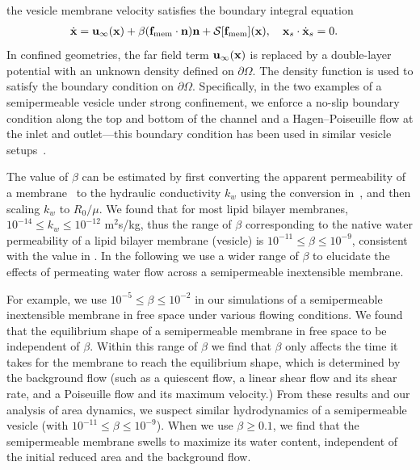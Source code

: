 \documentclass[prb,preprint,showpacs,preprintnumbers,amsmath,amssymb,longbibliography]{revtex4-1}
\begin{document}
%
the vesicle membrane velocity satisfies the boundary integral equation
\begin{align}
  \label{eqn:vesVelocity}
  \dot{\mathbf{x}} &= \mathbf{u}_\infty(\mathbf{x}) + \beta (\mathbf{f}_\mathrm{mem}\cdot\mathbf{n})\mathbf{n}
  + \mathcal{S} [\mathbf{f}_\mathrm{mem}](\mathbf{x}),  \quad
  \mathbf{x}_s \cdot \dot{\mathbf{x}}_s = 0.
\end{align}
In confined geometries, the far field term $\mathbf{u}_\infty(\mathbf{x})$ is replaced
by a double-layer potential with an unknown density defined on
$\partial\Omega$. The density function is used to satisfy the boundary
condition on $\partial\Omega$. Specifically, in the two examples of a semipermeable vesicle under strong confinement, we enforce a
no-slip boundary condition along the top and bottom of the channel and a
Hagen–Poiseuille flow at the inlet and outlet---this boundary condition
has been used in similar vesicle setups~\cite{qua-bir2014,
rah-vee-bir2010, lu-rah-zor2017}. 

The value of $\beta$ can be estimated by first
converting the apparent permeability of a 
membrane~\cite{OlbrichRawiczNeedhamEtAl2000_BJ} to the hydraulic
conductivity $k_w$ using the conversion
in~\citet{FettiplaceHaydon1980_PhysRev}, and then scaling $k_w$ to $R_0/\mu$. We found that for most lipid bilayer membranes, $10^{-14}\le
k_w\le 10^{-12}$ m$^2$s/kg, thus the range of $\beta$ corresponding to the native water permeability of a lipid bilayer membrane (vesicle) is $10^{-11}\le
\beta\le 10^{-9}$, consistent with the value in \citet{vogl2014effect}. In the following we use a wider range of $\beta$ to elucidate the effects of permeating water flow across a
semipermeable inextensible membrane.
%

For example, we use $10^{-5}\le\beta\le10^{-2}$
in our simulations of a semipermeable inextensible membrane in free space under various flowing conditions.
We found that 
the equilibrium shape of a semipermeable membrane in free space to be independent of $\beta$.
Within this range of $\beta$ we find that $\beta$ only affects the time it takes for the membrane to reach the equilibrium shape, which is determined by the background flow
(such as a quiescent flow, a linear shear flow and its shear rate, and a Poiseuille flow and its maximum velocity.)
From these results and our analysis of area dynamics, we suspect similar hydrodynamics of a semipermeable vesicle
(with $10^{-11}\le\beta\le 10^{-9}$). 
%
When we use $\beta\ge 0.1$, we find that the semipermeable membrane swells to maximize its water content, independent of the initial reduced 
area and the background flow.
%
%
\end{document}
